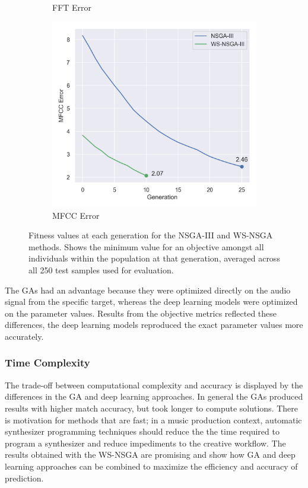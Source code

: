 \begin{figure}[ht]
\begin{subfigure}[b]{0.32\textwidth}
        \caption{FFT Error}
    \end{subfigure}
    \begin{subfigure}[b]{0.32\textwidth}
        \centering
        \includegraphics[width=\textwidth]{figures/inverse-synth/wsnsga_plots/mean_mfcc_error.png}
        \caption{MFCC Error}
    \end{subfigure}
    \caption{Fitness values at each generation for the NSGA-III and WS-NSGA methods. Shows the minimum value for an objective amongst all individuals within the population at that generation, averaged across all 250 test samples used for evaluation.}
    \label{fig:wsnsga-error}
\end{figure}

The GAs had an advantage because they were optimized directly on the audio signal from the specific target, whereas the deep learning models were optimized on the parameter values. Results from the objective metrics reflected these differences, the deep learning models reproduced the exact parameter values more accurately.

\subsubsection{Time Complexity}
The trade-off between computational complexity and accuracy is displayed by the differences in the GA and deep learning approaches. In general the GAs produced results with higher match accuracy, but took longer to compute solutions. There is motivation for methods that are fast; in a music production context, automatic synthesizer programming techniques should reduce the the time required to program a synthesizer and reduce impediments to the creative workflow. The results obtained with the WS-NSGA are promising and show how GA and deep learning approaches can be combined to maximize the efficiency and accuracy of prediction. %

